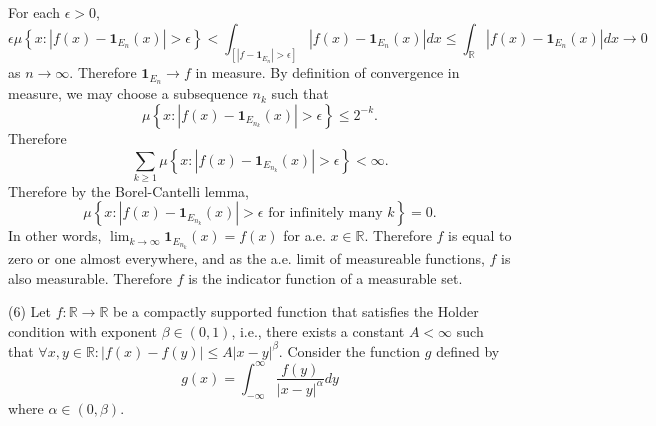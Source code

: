 \documentclass[answers]{exam}
\theoremstyle{problemstyle}
\newcommand{\1}[1]{\textbf{1}_{\left[#1\right]}} %
\def\R{\mathbb{R}} %
\begin{document}
\begin{questions}
\begin{solution}
For each $\epsilon>0$, 
\begin{equation*}
  \epsilon \mu \left\{ x: |f(x)-\mathbf{1}_{E_{n}}(x)| >\epsilon \right\}
  <  \int_{\left[|f-\mathbf{1}_{E_{n}}| >\epsilon \right]} |f(x)-\mathbf{1}_{E_{n}}(x)|dx
  \leq \int_{\R} |f(x)-\mathbf{1}_{E_{n}}(x)|dx \to 0
\end{equation*}
as $n\to \infty$.
Therefore $\mathbf{1}_{E_{n}}\to f$ in measure. By definition of convergence in measure, we may choose a subsequence $n_{k}$ such that
\begin{equation*}
  \mu \left\{ x: |f(x)-\mathbf{1}_{E_{n_{k}}}(x)|>\epsilon \right\} \leq 2^{-k}.
\end{equation*}
Therefore
\begin{equation*}
  \sum_{k\geq 1}\mu \left\{ x: |f(x)-\mathbf{1}_{E_{n_{k}}}(x)|>\epsilon \right\}<\infty.
\end{equation*}
Therefore by the Borel-Cantelli lemma,
\begin{equation*}
  \mu \left\{ x: |f(x)-\mathbf{1}_{E_{n_{k}}}(x)|>\epsilon \text{ for infinitely many }k \right\}=0.
\end{equation*}
In other words, $\lim_{k\to \infty} \mathbf{1}_{E_{n_{k}}}(x) = f(x)$ for a.e. $x\in \R$. Therefore $f$ is equal to zero or one almost everywhere, and as the a.e. limit of measureable functions, $f$ is also measurable. Therefore $f$ is the indicator function of a measurable set.

\end{solution}




\question (6) Let $f: \R\to\R$ be a compactly supported function that satisfies the Holder condition with exponent $\beta\in (0,1)$, i.e., there exists a constant $A<\infty$ such that $\forall x,y\in \R: |f(x)-f(y)|\leq A|x-y|^{\beta}$. Consider the function $g$ defined by
\begin{equation*}
g(x) = \int_{-\infty}^{\infty} \frac{f(y)}{|x-y|^{\alpha}} dy
\end{equation*}
where $\alpha \in (0,\beta).$
\begin{parts}

\end{parts}
\end{questions}
\end{document}
